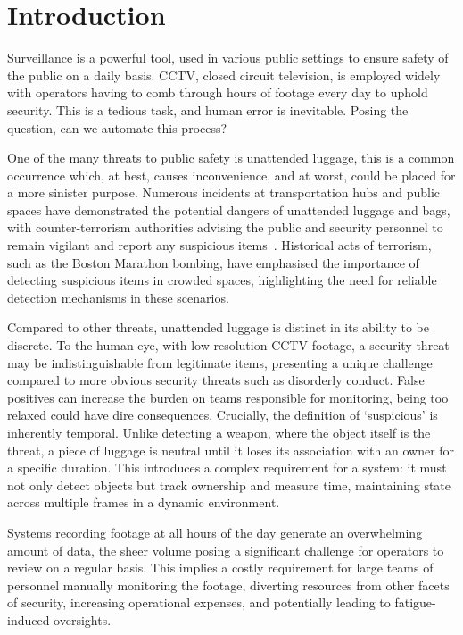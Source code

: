 \section{Introduction}
\label{sec:introduction}

Surveillance is a powerful tool, used in various public settings to ensure
safety of the public on a daily basis. CCTV, closed circuit television, is
employed widely with operators having to comb through hours of footage every
day to uphold security. This is a tedious task, and human error is inevitable.
Posing the question, can we automate this process?

One of the many threats to public safety is unattended luggage, this is a
common occurrence which, at best, causes inconvenience, and at worst, could be
placed for a more sinister purpose. Numerous incidents at transportation hubs
and public spaces have demonstrated the potential dangers of unattended luggage
and bags, with counter-terrorism authorities advising the public and security
personnel to remain vigilant and report any suspicious
items~\citep{protectuk2022unattended}. Historical acts of terrorism, such as
the Boston Marathon bombing, have emphasised the importance of detecting
suspicious items in crowded spaces, highlighting the need for reliable
detection mechanisms in these scenarios.

Compared to other threats, unattended luggage is distinct in its ability to be
discrete. To the human eye, with low-resolution CCTV footage, a security threat
may be indistinguishable from legitimate items, presenting a unique challenge
compared to more obvious security threats such as disorderly conduct. False
positives can increase the burden on teams responsible for monitoring, being
too relaxed could have dire consequences. Crucially, the definition of
`suspicious' is inherently temporal. Unlike detecting a weapon, where the
object itself is the threat, a piece of luggage is neutral until it loses its
association with an owner for a specific duration. This introduces a complex
requirement for a system: it must not only detect objects but track ownership
and measure time, maintaining state across multiple frames in a dynamic
environment.

Systems recording footage at all hours of the day generate an overwhelming
amount of data, the sheer volume posing a significant challenge for operators
to review on a regular basis. This implies a costly requirement for large teams
of personnel manually monitoring the footage, diverting resources from other
facets of security, increasing operational expenses, and potentially leading to
fatigue-induced oversights.

